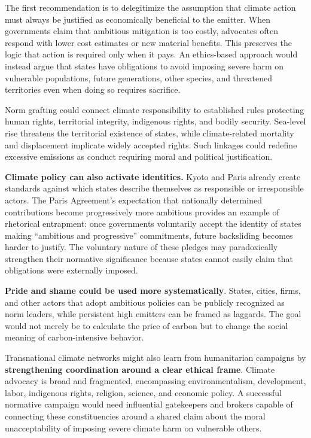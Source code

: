 The first recommendation is to delegitimize the assumption that climate action must always be justified as economically beneficial to the emitter. When governments claim that ambitious mitigation is too costly, advocates often respond with lower cost estimates or new material benefits. This preserves the logic that action is required only when it pays. An ethics-based approach would instead argue that states have obligations to avoid imposing severe harm on vulnerable populations, future generations, other species, and threatened territories even when doing so requires sacrifice.

Norm grafting could connect climate responsibility to established rules protecting human rights, territorial integrity, indigenous rights, and bodily security. Sea-level rise threatens the territorial existence of states, while climate-related mortality and displacement implicate widely accepted rights. Such linkages could redefine excessive emissions as conduct requiring moral and political justification.

\textbf{Climate policy can also activate identities.} Kyoto and Paris already create standards against which states describe themselves as responsible or irresponsible actors. The Paris Agreement's expectation that nationally determined contributions become progressively more ambitious provides an example of rhetorical entrapment: once governments voluntarily accept the identity of states making ``ambitious and progressive'' commitments, future backsliding becomes harder to justify. The voluntary nature of these pledges may paradoxically strengthen their normative significance because states cannot easily claim that obligations were externally imposed.

\textbf{Pride and shame could be used more systematically}. States, cities, firms, and other actors that adopt ambitious policies can be publicly recognized as norm leaders, while persistent high emitters can be framed as laggards. The goal would not merely be to calculate the price of carbon but to change the social meaning of carbon-intensive behavior.

Transnational climate networks might also learn from humanitarian campaigns by \textbf{strengthening coordination around a clear ethical frame}. Climate advocacy is broad and fragmented, encompassing environmentalism, development, labor, indigenous rights, religion, science, and economic policy. A successful normative campaign would need influential gatekeepers and brokers capable of connecting these constituencies around a shared claim about the moral unacceptability of imposing severe climate harm on vulnerable others.

